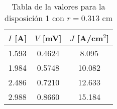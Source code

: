 \begin{table}[h!]
    \centering
\begin{tabular}{ccc}
\toprule
$I$ [A] & $V$ [mV] & $J$ [A/cm$^2$] \\
\midrule
1.593 & 0.4624 & 8.095 \\
1.984 & 0.5748 & 10.082 \\
2.486 & 0.7210 & 12.633 \\
2.988 & 0.8660 & 15.184 \\
\bottomrule
\end{tabular}
    \caption{Tabla de la valores para la disposición 1 con $r=0.313$ cm}
    \label{Tab:VIJ_1}
\end{table}
